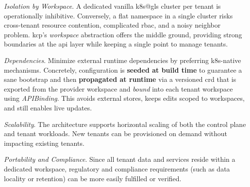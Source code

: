 \documentclass[11pt, a4paper, oneside, listof=totoc]{scrartcl}
\begin{document}
                \begin{enumerate}[label={[\arabic*]:},
                    ref=Challenge~\arabic*,
                    leftmargin=*,
                    itemsep=0.6\baselineskip]

                    \item\label{chal:isolationByWorkspace}
                        \textit{Isolation by Workspace}.
                        A dedicated vanilla \gls{k8s@gls} cluster per tenant is operationally
                        inhibitive.
                        Conversely, a flat namespace in a single cluster risks cross-tenant resource
                        contention, complicated \gls{rbac}, and a noisy neighbor problem.
                        \gls{kcp}'s \textit{workspace} abstraction offers the middle ground,
                        providing strong boundaries at the \gls{api} layer while keeping a single
                        point to manage tenants.

                    \item\label{chal:dependencies}
                        \textit{Dependencies}.
                        Minimize external runtime dependencies by preferring \gls{k8s}-native
                        mechanisms.
                        Concretely, configuration is \textbf{seeded at build time} to guarantee a
                        sane bootstrap and then \textbf{propagated at runtime} via a versioned
                        \gls{crd} that is exported from the provider workspace and \emph{bound} into
                        each tenant workspace using \emph{APIBinding}.
                        This avoids external stores, keeps edits scoped to workspaces, and still
                        enables live updates.

                    \item\label{chal:scalabilitySupport}
                        \textit{Scalability}.
                        The architecture supports horizontal scaling of both the
                        control plane and tenant workloads.
                        New tenants can be provisioned on demand without impacting existing tenants.

                    \item\label{chal:portabilityAndCompliance}
                        \textit{Portability and Compliance}.
                        Since all tenant data and services reside within a dedicated workspace,
                        regulatory and compliance requirements (such as data locality or retention)
                        can be more easily fulfilled or verified.


\end{enumerate}
\end{document}

